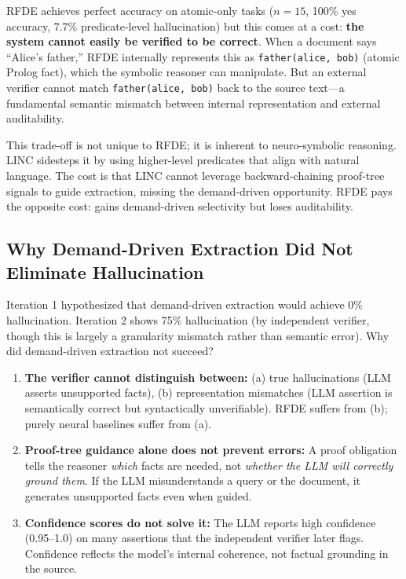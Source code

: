 \documentclass[11pt,letterpaper]{article}
\begin{document}
RFDE achieves perfect accuracy on atomic-only tasks ($n=15$, 100\% yes accuracy, 7.7\% predicate-level hallucination) but this comes at a cost: \textbf{the system cannot easily be verified to be correct}. When a document says ``Alice's father,'' RFDE internally represents this as \texttt{father(alice, bob)} (atomic Prolog fact), which the symbolic reasoner can manipulate. But an external verifier cannot match \texttt{father(alice, bob)} back to the source text---a fundamental semantic mismatch between internal representation and external auditability.

This trade-off is not unique to RFDE; it is inherent to neuro-symbolic reasoning. LINC sidesteps it by using higher-level predicates that align with natural language. The cost is that LINC cannot leverage backward-chaining proof-tree signals to guide extraction, missing the demand-driven opportunity. RFDE pays the opposite cost: gains demand-driven selectivity but loses auditability.

\subsection{Why Demand-Driven Extraction Did Not Eliminate Hallucination}

Iteration 1 hypothesized that demand-driven extraction would achieve 0\% hallucination. Iteration 2 shows 75\% hallucination (by independent verifier, though this is largely a granularity mismatch rather than semantic error). Why did demand-driven extraction not succeed?

\begin{enumerate}
  \item \textbf{The verifier cannot distinguish between:} (a) true hallucinations (LLM asserts unsupported facts), (b) representation mismatches (LLM assertion is semantically correct but syntactically unverifiable). RFDE suffers from (b); purely neural baselines suffer from (a).

  \item \textbf{Proof-tree guidance alone does not prevent errors:} A proof obligation tells the reasoner \emph{which} facts are needed, not \emph{whether the LLM will correctly ground them}. If the LLM misunderstands a query or the document, it generates unsupported facts even when guided.

  \item \textbf{Confidence scores do not solve it:} The LLM reports high confidence (0.95--1.0) on many assertions that the independent verifier later flags. Confidence reflects the model's internal coherence, not factual grounding in the source.
\end{enumerate}
\end{document}
